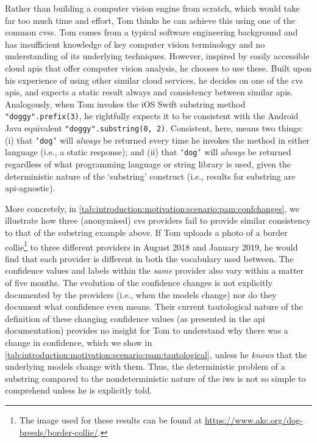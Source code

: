Rather than building a computer vision engine from scratch, which would take far too much time and effort, Tom thinks he can achieve this using one of the common \glspl{cvs}. Tom comes from a typical software engineering background and has insufficient knowledge of key computer vision terminology and no understanding of its underlying techniques. However, inspired by easily accessible cloud \glspl{api} that offer computer vision analysis, he chooses to use these. Built upon his experience of using other similar cloud services, he decides on one of the \gls{cvs} \glspl{api}, and expects a static result always and consistency between similar \glspl{api}. Analogously, when Tom invokes the iOS Swift substring method \texttt{"doggy".prefix(3)}, he rightfully expects it to be consistent with the Android Java equivalent \texttt{"doggy".substring(0, 2)}. Consistent, here, means two things: (i) that \texttt{`dog'} will \textit{always} be returned every time he invokes the method in either language (i.e., a static response); and (ii) that \texttt{`dog'} will \textit{always} be returned regardless of what programming language or string library is used, given the deterministic nature of the `substring' construct (i.e., results for substring are \gls{api}-agnostic). 



More concretely, in \cref{tab:introduction:motivation:scenario:pam:confchanges}, we illustrate how three (anonymised) \gls{cvs} providers fail to provide similar consistency to that of the substring example above. If Tom uploads a photo of a border collie\footnote{The image used for these results can be found at \url{https://www.akc.org/dog-breeds/border-collie/}.} to three different providers in August 2018 and January 2019, he would find that each provider is different in both the vocabulary used between. The confidence values and labels within the \textit{same} provider also vary within a matter of five months. The evolution of the confidence changes is not explicitly documented by the providers (i.e., when the models change) nor do they document what confidence even means. Their current tautological nature of the definition of these changing confidence values (as presented in the \gls{api} documentation) provides no insight for Tom to understand why there was a change in confidence, which we show in \cref{tab:introduction:motivation:scenario:pam:tautological}, unless he \textit{knows} that the underlying models change with them. Thus, the deterministic problem of a substring compared to the nondeterministic nature of the \gls{iws} is not so simple to comprehend unless he is explicitly told.


